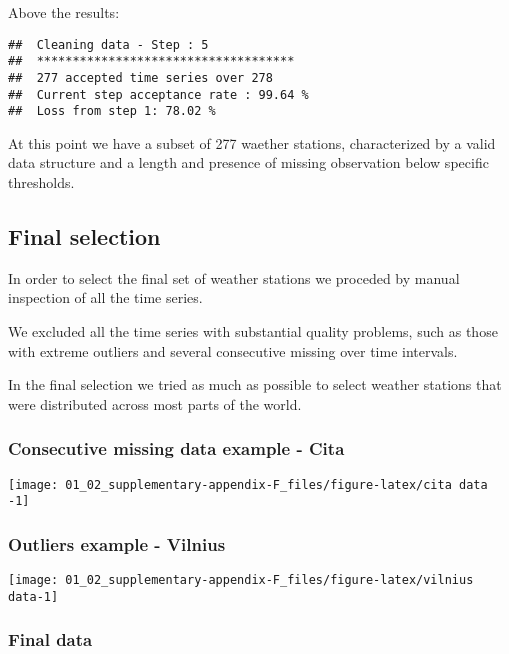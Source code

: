 \documentclass[]{article}
\begin{document}
Above the results:

\begin{verbatim}
##  Cleaning data - Step : 5 
##  ************************************ 
##  277 accepted time series over 278 
##  Current step acceptance rate : 99.64 % 
##  Loss from step 1: 78.02 %
\end{verbatim}

At this point we have a subset of 277 waether stations, characterized by
a valid data structure and a length and presence of missing observation
below specific thresholds.

\hypertarget{final-selection}{%
\subsection{Final selection}\label{final-selection}}

In order to select the final set of weather stations we proceded by
manual inspection of all the time series.

We excluded all the time series with substantial quality problems, such
as those with extreme outliers and several consecutive missing over time
intervals.

In the final selection we tried as much as possible to select weather
stations that were distributed across most parts of the world.

\hypertarget{consecutive-missing-data-example---cita}{%
\subsubsection{Consecutive missing data example -
Cita}\label{consecutive-missing-data-example---cita}}

\begin{center}\texttt{[image: 01\_02\_supplementary-appendix-F\_files/figure-latex/cita data -1]} \end{center}

\hypertarget{outliers-example---vilnius}{%
\subsubsection{Outliers example -
Vilnius}\label{outliers-example---vilnius}}

\begin{center}\texttt{[image: 01\_02\_supplementary-appendix-F\_files/figure-latex/vilnius data-1]} \end{center}

\hypertarget{final-data}{%
\subsubsection{Final data}\label{final-data}}
\end{document}
